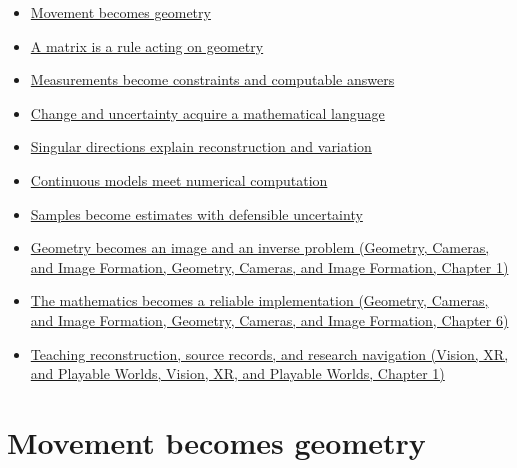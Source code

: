 \begin{itemize}
\tightlist
\item
  \hyperref[01-foundations-i-ch017-movement-becomes-geometry]{Movement becomes geometry}
\item
  \hyperref[01-foundations-i-ch018-a-matrix-is-a-rule-acting-on-geometry]{A matrix is a rule acting on geometry}
\item
  \hyperref[01-foundations-i-ch019-measurements-become-constraints-and-computable-answers]{Measurements become constraints and computable answers}
\item
  \hyperref[01-foundations-i-ch020-change-and-uncertainty-acquire-a-mathematical-language]{Change and uncertainty acquire a mathematical language}
\item
  \hyperref[02-foundations-ii-ch024-singular-directions-explain-reconstruction-and-variation]{Singular directions explain reconstruction and variation}
\item
  \hyperref[02-foundations-ii-ch025-continuous-models-meet-numerical-computation]{Continuous models meet numerical computation}
\item
  \hyperref[02-foundations-ii-ch029-samples-become-estimates-with-defensible-uncertainty]{Samples become estimates with defensible uncertainty}
\item
  \href{../03-Geometry-Cameras-and-Image-Formation/main.pdf\#nameddest=02-foundations-ii-ch032-geometry-becomes-an-image-and-an-inverse-problem-1}{Geometry becomes an image and an inverse problem (Geometry, Cameras, and Image Formation, Geometry, Cameras, and Image Formation, Chapter 1)}
\item
  \href{../03-Geometry-Cameras-and-Image-Formation/main.pdf\#nameddest=02-foundations-ii-ch037-the-mathematics-becomes-a-reliable-implementation}{The mathematics becomes a reliable implementation (Geometry, Cameras, and Image Formation, Geometry, Cameras, and Image Formation, Chapter 6)}
\item
  \href{../07-Vision-XR-and-Playable-Worlds/main.pdf\#nameddest=02-foundations-ii-ch039-teaching-reconstruction-source-records-and-research-navigation}{Teaching reconstruction, source records, and research navigation (Vision, XR, and Playable Worlds, Vision, XR, and Playable Worlds, Chapter 1)}
\end{itemize}

\section{Movement becomes geometry}\label{01-foundations-i-ch017-movement-becomes-geometry}

